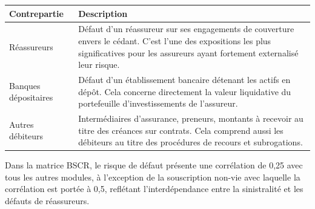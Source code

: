 \documentclass[
]{article}
\begin{document}
\begin{longtable}[]{@{}
  >{\raggedright\arraybackslash}p{}
  >{\raggedright\arraybackslash}p{}@{}}
\toprule\noalign{}
\begin{minipage}[b]{\linewidth}\raggedright
Contrepartie
\end{minipage} & \begin{minipage}[b]{\linewidth}\raggedright
Description
\end{minipage} \\
\midrule\noalign{}
\endhead
\bottomrule\noalign{}
\endlastfoot
Réassureurs & Défaut d'un réassureur sur ses engagements de couverture
envers le cédant. C'est l'une des expositions les plus significatives
pour les assureurs ayant fortement externalisé leur risque. \\
Banques dépositaires & Défaut d'un établissement bancaire détenant les
actifs en dépôt. Cela concerne directement la valeur liquidative du
portefeuille d'investissements de l'assureur. \\
Autres débiteurs & Intermédiaires d'assurance, preneurs, montants à
recevoir au titre des créances sur contrats. Cela comprend aussi les
débiteurs au titre des procédures de recours et subrogations. \\
\end{longtable}

Dans la matrice BSCR, le risque de défaut présente une corrélation de
0,25 avec tous les autres modules, à l'exception de la souscription
non-vie avec laquelle la corrélation est portée à 0,5, reflétant
l'interdépendance entre la sinistralité et les défauts de réassureurs.
\end{document}

